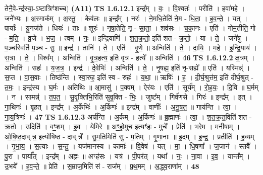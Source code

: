 \documentclass[17pt]{extarticle}
\begin{document}
                      तेनै॒वे-न्द्र॑स्या॒-ऽष्टात्रिꣳ॑शच्च)  \textbf{(A11)} \newline \newline
                                \textbf{ TS 1.6.12.1} \newline
                  इन्द्र᳚म् । वः॒ । वि॒श्वतः॑ । परीति॑ । हवा॑महे । जने᳚भ्यः ॥ अ॒स्माक᳚म् । अ॒स्तु॒ । केव॑लः ॥ इन्द्र᳚म् । नरः॑ । ने॒मधि॒तेति॑ ने॒म - धि॒ता॒ । ह॒व॒न्ते॒ । यत् । पार्याः᳚ । यु॒नज॑ते । धियः॑ । ताः ॥ शूरः॑ । नृषा॒तेति॒ नृ - सा॒ता॒ । शव॑सः । च॒का॒नः । एति॑ । गोम॒तीति॒ गो - म॒ति॒ । व्र॒जे । भ॒ज॒ । त्वम् । नः॒ ॥ इ॒न्द्रि॒याणि॑ । श॒त॒क्र॒तो॒ इति॑ शत - क्र॒तो॒ । या । ते॒ । जने॑षु । प॒ञ्चस्विति॑॑ प॒ञ्च - सु॒ ॥ इन्द्र॑ । तानि॑ । ते॒ । एति॑ । वृ॒णे॒ ॥ अन्विति॑ । ते॒ । दा॒यि॒ । म॒हे । इ॒न्द्रि॒याय॑ । स॒त्रा । ते॒ । विश्व᳚म् । अन्विति॑ । वृ॒त्र॒हत्य॒ इति॑ वृत्र - हत्ये᳚ ॥ अन्विति॑ । \textbf{  46} \newline
                  \newline
                                \textbf{ TS 1.6.12.2} \newline
                  क्ष॒त्रम् । अन्विति॑ । सहः॑ । य॒ज॒त्र॒ । इन्द्र॑ । दे॒वेभिः॑ । अन्विति॑ । ते॒ । नृ॒षह्य॒ इति॑ नृ-सह्ये᳚ ॥ एति॑ । यस्मिन्न्॑ । स॒प्त । वा॒स॒वाः । तिष्ठ॑न्ति । स्वा॒रुह॒ इति॑ स्व - रुहः॑ । य॒था॒ ॥ ऋषिः॑ । ह॒ । दी॒र्घ॒श्रुत्त॑म॒ इति॑ दीर्घ॒श्रुत् - त॒मः॒ । इन्द्र॑स्य । घ॒र्मः । अति॑थिः ॥ आ॒मासु॑ । प॒क्वम् । ऐर॑यः । एति॑ । सूर्य᳚म् । रो॒ह॒यः॒ । दि॒वि ॥ घ॒र्मम् । न । सामन्न्॑ । त॒प॒त॒ । सु॒वृ॒क्तिभि॒रिति॑ सुवृ॒क्ति - भिः॒ । जुष्ट᳚म् । गिर्व॑णसे । गिरः॑ ॥ इन्द्र᳚म् । इत् । गा॒थिनः॑ । बृ॒हत् । इन्द्र᳚म् । अ॒र्केभिः॑ । अ॒र्किणः॑ ॥ इन्द्र᳚म् । वाणीः᳚ । अ॒नू॒ष॒त॒ ॥ गाय॑न्ति । त्वा॒ । गा॒य॒त्रिणः॑ । \textbf{  47} \newline
                  \newline
                                \textbf{ TS 1.6.12.3} \newline
                  अर्च॑न्ति । अ॒र्कम् । अ॒र्किणः॑ ॥ ब्र॒ह्माणः॑ । त्वा॒ । श॒त॒क्र॒त॒विति॑ शत - क्र॒तो॒ । उदिति॑ । वꣳ॒॒शम् । इ॒व॒ । ये॒मि॒रे॒ ॥ अꣳ॒॒हो॒मुच॒ इत्यꣳ॑हः - मुचे᳚ । प्रेति॑ । भ॒रे॒म॒ । म॒नी॒षाम् । ओ॒षि॒ष्ठ॒दाव्.न्न॒ इत्यो॑षिष्ठ - दाव्.न्ने᳚ । सु॒म॒तिमिति॑ सु - म॒तिम् । गृ॒णा॒नाः ॥ इ॒दम् । इ॒न्द्र॒ । प्रतीति॑ । ह॒व्यम् । गृ॒भा॒य॒ । स॒त्याः । स॒न्तु॒ । यज॑मानस्य । कामाः᳚ ॥ वि॒वेष॑ । यत् । मा॒ । धि॒षणा᳚ । ज॒जान॑ । स्तवै᳚ । पु॒रा । पार्या᳚त् । इन्द्र᳚म् । अह्नः॑ ॥ अꣳह॑सः । यत्र॑ । पी॒पर॑त् । यथा᳚ । नः॒ । ना॒वा । इ॒व॒ । यान्त᳚म् । उ॒भये᳚ । ह॒व॒न्ते॒ ॥ प्रेति॑ । स॒म्राज॒मिति॑ सं - राज᳚म् । प्र॒थ॒मम् । अ॒द्ध्व॒राणा᳚म् । \textbf{  48} \newline
\end{document}
